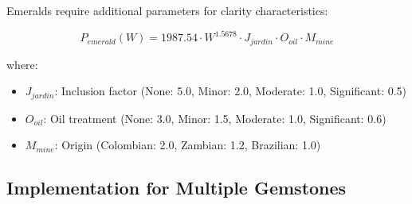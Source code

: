 Emeralds require additional parameters for clarity characteristics:

\begin{equation}
P_{emerald}(W) = 1987.54 \cdot W^{1.5678} \cdot J_{jardin} \cdot O_{oil} \cdot M_{mine}
\end{equation}

where:
\begin{itemize}
\item $J_{jardin}$: Inclusion factor (None: 5.0, Minor: 2.0, Moderate: 1.0, Significant: 0.5)
\item $O_{oil}$: Oil treatment (None: 3.0, Minor: 1.5, Moderate: 1.0, Significant: 0.6)
\item $M_{mine}$: Origin (Colombian: 2.0, Zambian: 1.2, Brazilian: 1.0)
\end{itemize}

\subsection{Implementation for Multiple Gemstones}

